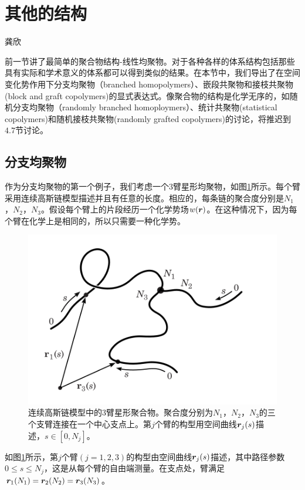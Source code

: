 \section{其他的结构}
\begin{center}
龚欣
\end{center}

前一节讲了最简单的聚合物结构-线性均聚物。对于各种各样的体系结构包括那些具有实际和学术意义的体系都可以得到类似的结果。在本节中，我们导出了在空间变化势作用下分支均聚物（branched homopolymers）、嵌段共聚物和接枝共聚物(block and graft copolymers)的显式表达式。像聚合物的结构是化学无序的，如随机分支均聚物（randomly branched homoploymers）、统计共聚物(statistical copolymers)和随机接枝共聚物(randomly grafted copolymers)的讨论，将推迟到$4.7$节讨论。
\subsection{分支均聚物}
作为分支均聚物的第一个例子，我们考虑一个$3$臂星形均聚物，如图\ref{三臂星形均聚物}所示。每个臂采用连续高斯链模型描述并且有任意的长度。相应的，每条链的聚合度分别是$N_1$，$N_2$，$N_3$。假设每个臂上的片段经历一个化学势场$w (\bm{r})$。在这种情况下，因为每个臂在化学上是相同的，所以只需要一种化学势。
\begin{figure}[H]
\centering
\includegraphics[scale=0.7]{Contents/chapter3/figures/34.png}
\caption{连续高斯链模型中的$3$臂星形聚合物。聚合度分别为$N_1$，$N_2$，$N_3$的三个支臂连接在一个中心支点上。第$j$个臂的构型用空间曲线$\bm{r}_j(s)$描述，$s\in [0,N_j]$。}
\label{三臂星形均聚物}
\end{figure}

如图\ref{三臂星形均聚物}所示，第$j$个臂$(j=1,2,3)$的构型由空间曲线$\bm{r}_j(s)$描述，其中路径参数$0\leq s\leq N_j$，这是从每个臂的自由端测量。在支点处，臂满足$\bm{r}_1(N_1)=\bm{r}_2(N_2)=\bm{r}_3(N_3)$。

